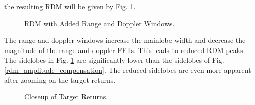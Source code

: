 \documentclass[conference]{IEEEtran}
\begin{document}
the resulting RDM will be given by Fig. \ref{rdm_fft_windowing}.
\begin{figure}[H]
\centerline{}
\caption{RDM with Added Range and Doppler Windows.}
\label{rdm_fft_windowing}
\end{figure}
\noindent
The range and doppler windows increase the mainlobe width and decrease the magnitude of the range and doppler FFTs. This leads to reduced RDM peaks. The sidelobes in Fig. \ref{rdm_fft_windowing} are significantly lower than the sidelobes of Fig. \ref{rdm_amplitude_compensation}. The reduced sidelobes are even more apparent after zooming on the target returns.
\begin{figure}[H]
\centerline{}
\caption{Closeup of Target Returns.}
\label{rdm_fft_windowing_close}
\end{figure}
\end{document}
